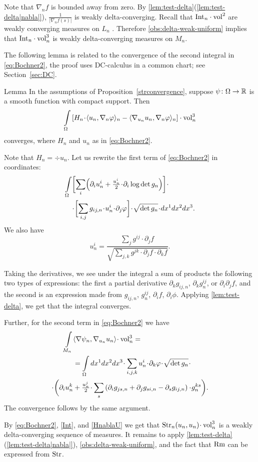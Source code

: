 Note that $\nabla_n f$ is bounded away from zero.
By \ref{lem:test-delta}(\ref{lem:test-delta|nabla|}), $\frac{1}{|\nabla_n f(s)|}$ is weakly delta-converging.
Recall that $\Int_n\cdot \vol^2$ are weakly converging measures on $L_n$ \cite[VII \S13]{AZ}.
Therefore \ref{obs:delta-weak-uniform} implies
that $\Int_n\cdot\vol^3_n$ is weakly delta-converging measures on $M_n$.
\qeds

The following lemma is related to the convergence of the second integral in \ref{eq:Bochner2}, the proof uses
DC-calculus in a common chart; see Section~\ref{sec:DC}.

\begin{thm}{Lemma}\label{HnablaU}
In the assumptions of Proposition~\ref{strconvergence}, 
suppose $\psi\:\Omega\zz\to\RR$ is a smooth function with compact support.
Then
\[\int\limits_\Omega \l[H_n\cdot\<u_n,\nabla_n\phi\>_n- \<\nabla_{u_n} u_n,\nabla_n\phi\>_n \r]\cdot\vol^3_n\]
converges, where $H_n$ and $u_n$ as in  \ref{eq:Bochner2}.
\end{thm}

Note that $H_n=\div u_n$.
Let us rewrite the first term of \ref{eq:Bochner2} in coordinates:
\begin{align*}
\int\limits_{\Omega}
&\biggl[
\sum_{i}
\Bigl(\partial_i u_n^i
+
\tfrac{u^i_n}{2}\cdot\partial_i \log \det g_{n}\Bigr)\biggr]
\cdot
\\
&\cdot
\biggl[\sum_{i,j} g_{ij,n} \cdot u_n^i\cdot \partial_j \phi\biggr]
\cdot\sqrt {\det g_n}
\cdot dx^1 dx^2 dx^3.
\end{align*}
We also have
$$u_n^i
=
\frac{\sum_j g^{ij}\cdot\partial_j f}
{\sqrt{\sum_{j,k}g^{jk}\cdot\partial_j f\cdot\partial_k f}}.$$

Taking the derivatives, we see under the integral a sum of products the following two types of expressions:
the first a partial derivative
$\partial_kg_{ij,n}$,
$\partial_kg^{ij}_n$,
or $\partial_i\partial_j f$,
and the second is an expression made from
$g_{ij,n}$,
$g^{ij}_n$,
$\partial_i f$,
$\partial_i \phi$.
Applying \ref{lem:test-delta}, we get that 
the integral converges.

Further, for the second term in \ref{eq:Bochner2}
we have
\begin{align*}
\int\limits_{M_n}&\<\nabla\psi_n,\nabla_{u_n} u_n\>\cdot\vol^3_n=\\
&=
\int\limits_{\Omega}
dx^1 dx^2 dx^3\cdot
\sum_{i,j,k}
u^i_n\cdot \partial_k \phi\cdot\sqrt{\op{det}g_{n}}\cdot
\\
\cdot\biggl(
\partial_i u^k_n&+
\tfrac{u^j_n}2
\cdot
\sum_s
\left(
\partial_i g_{ js,n}
+
\partial_j g_{si,n}
-
\partial_s g_{i j,n}\right)
\cdot
g^{ks}_n
\biggr).
\end{align*}
The convergence follows by the same argument.
\qeds

By \ref{eq:Bochner2}, \ref{Int}, and \ref{HnablaU} we get that $\Str_n(u_n,u_n)\zz\cdot \vol^3_n$ is a weakly delta-converging sequence of measures.
It remains to apply \ref{lem:test-delta}(\ref{lem:test-delta|nabla|}),
\ref{obs:delta-weak-uniform},
and the fact that $\operatorname{\rm Rm}$ can be expressed from $\operatorname{\rm Str}$.
\qeds
